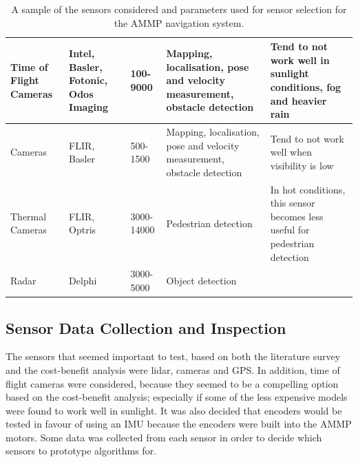 \documentclass[preprint,authoryear,12pt]{elsarticle}
\begin{document}
\begin{table}[h!]
\begin{tabular}{ | m{1.4cm} | m{2.9cm}| m{1.4cm} | m{2.9cm} | m{2.9cm} }
            \hline
            \scriptsize Time of Flight Cameras & \scriptsize Intel, Basler, Fotonic, Odos Imaging & \scriptsize 100-9000 & \scriptsize Mapping, localisation, pose and velocity measurement, obstacle detection & \scriptsize Tend to not work well in sunlight conditions, fog and heavier rain \\
            \hline
            \scriptsize Cameras & \scriptsize FLIR, Basler & \scriptsize 500-1500 & \scriptsize Mapping, localisation, pose and velocity measurement, obstacle detection & \scriptsize Tend to not work well when visibility is low \\
            \hline
            \scriptsize Thermal Cameras & \scriptsize FLIR, Optris & \scriptsize 3000-14000 & \scriptsize Pedestrian detection & \scriptsize In hot conditions, this sensor becomes less useful for pedestrian detection \\
            \hline
            \scriptsize Radar & \scriptsize Delphi & \scriptsize 3000-5000 & \scriptsize Object detection & \scriptsize \\
            \hline
        \end{tabular}
        \label{table:2}
        \caption{A sample of the sensors considered and parameters used for sensor selection for the AMMP navigation system.}
    \end{table}

\subsection{Sensor Data Collection and Inspection}
    The sensors that seemed important to test, based on both the literature survey and the cost-benefit analysis were lidar, cameras and GPS. In addition, time of flight cameras were considered, because they seemed to be a compelling option based on the cost-benefit analysis; especially if some of the less expensive models were found to work well in sunlight. It was also decided that encoders would be tested in favour of using an IMU because the encoders were built into the AMMP motors. Some data was collected from each sensor in order to decide which sensors to prototype algorithms for.
\end{document}
